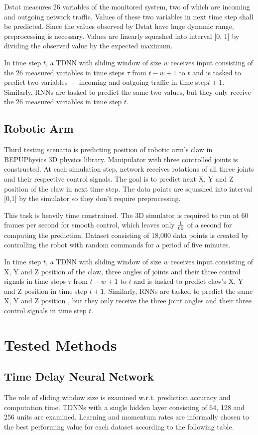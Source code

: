\documentclass[12pt,oneside]{fithesis2}
\begin{document}
Dstat measures 26 variables of the monitored system, two of which are incoming and outgoing network traffic. Values of these two variables in next time step shall be predicted. Since the values observed by Dstat have huge dynamic range, preprocessing is necessary. Values are linearly squashed into interval [0, 1] by dividing the observed value by the expected maximum. \par
In time step $t$, a TDNN with sliding window of size $w$ receives input consisting of the 26 measured variables in time steps $\tau$ from $t-w+1$ to $t$ and is tasked to predict two variables --- incoming and outgoing traffic in time step$t+1$. Similarly, RNNs are tasked to predict the same two values, but they only receive the 26 measured variables in time step $t$.


\subsection{Robotic Arm}
Third testing scenario is predicting position of robotic arm's claw in BEPUPhysics 3D physics library. Manipulator with three controlled joints is constructed. At each simulation step, network receives rotations of all three joints and their respective control signals. The goal is to predict next X, Y and Z position of the claw in next time step. The data points are squashed into interval [0,1] by the simulator so they don't require preprocessing.\par
This task is heavily time constrained. The 3D simulator is required to run at 60 frames per second for smooth control, which leaves only $1 \over 60$ of a second for computing the prediction. Dataset consisting of 18,000 data points is created by controlling the robot with random commands for a period of five minutes. \par
In time step $t$, a TDNN with sliding window of size $w$ receives input consisting of X, Y and Z position of the claw, three angles of joints and their three control signals in time steps $\tau$ from $t-w+1$ to $t$ and is tasked to predict claw's X, Y and Z position in time step $t+1$. Similarly, RNNs are tasked to predict the same X, Y and Z position , but they only receive the three joint angles and their three control signals in time step $t$.

\section{Tested Methods}

\subsection{Time Delay Neural Network}
The role of sliding window size is examined w.r.t. prediction accuracy and computation time. TDNNs with a single hidden layer consisting of 64, 128 and 256 units are examined. Learning and momentum rates are informally chosen to the best performing value for each dataset according to the following table.
\end{document}

